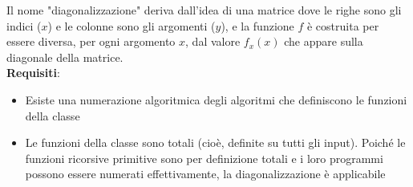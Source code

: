 \documentclass[12pt, a4paper]{report}
\begin{document}
                 Il nome "diagonalizzazione" deriva dall'idea di una matrice dove le righe sono gli indici ($x$) e le colonne sono gli argomenti ($y$), e la funzione $f$ è costruita per essere diversa, per ogni argomento $x$, dal valore $f_x(x)$ che appare sulla diagonale della matrice.\\
                 \textbf{Requisiti}: \begin{itemize}
                    \item Esiste una numerazione algoritmica degli algoritmi che definiscono le funzioni della classe
                    \item Le funzioni della classe sono totali (cioè, definite su tutti gli input). Poiché le funzioni ricorsive primitive sono per definizione totali e i loro programmi possono essere numerati effettivamente, la diagonalizzazione è applicabile
                 \end{itemize}
\end{document}
